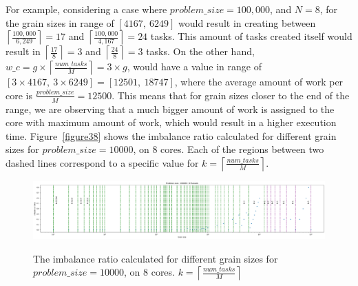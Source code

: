 \vspace{\baselineskip}
For example, considering a case where $problem\_{size}=100,000$, and $N=8$, for the grain sizes in range of $[4167,\:6249]$ would result in creating between $\left \lceil{\frac{100,000}{6,249}}\right \rceil=17$ and  $\left \lceil{\frac{100,000}{4,167}}\right \rceil=24$ tasks. This amount of tasks created itself would result in $\left \lceil{\frac{17}{8}}\right \rceil=3$ and  $\left \lceil{\frac{24}{8}}\right \rceil=3$ tasks.
On the other hand, $w\_c=g\times{\left \lceil{\frac{num\_{tasks}}{M}}\right \rceil}=3\times{g}$, would have a value in range of $[3\times4167,\:3\times6249]=[12501,\: 18747]$, where the average amount of work per core is $\frac{problem\_{size}}{M}=12500$. This means that for grain sizes closer to the end of the range, we are observing that a much bigger amount of work is assigned to the core with maximum amount of work, which would result in a higher execution time. 
Figure~\ref{figure38} shows the imbalance ratio calculated for different grain sizes for $problem\_size=10000$, on 8 cores. Each of the regions between two dashed lines correspond to a specific value for $k=\left\lceil{\frac{num\_{tasks}}{M}}\right \rceil$. 


\vspace{\baselineskip}	
\begin{figure}[H]
	\centering
	{\includegraphics[scale=.25]{images/hpx_for_loop/w_c.png}}
	\caption{The imbalance ratio calculated for different grain sizes for $problem\_size=10000$, on 8 cores. $k=\left\lceil{\frac{num\_{tasks}}{M}}\right \rceil$}\label{fig38}		
\end{figure}



